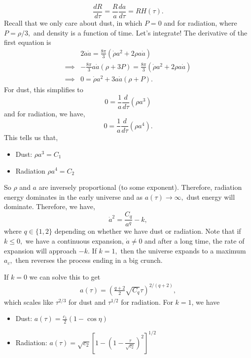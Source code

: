 \documentclass{article}
\numberwithin{equation}{section}
\begin{document}
\begin{equation}
    \frac{dR}{d\tau} = \frac{R}{a} \frac{da}{d\tau} = RH(\tau).
\end{equation}
Recall that we only care about dust, in which $P=0$ and for radiation, where $P=\rho/3,$ and density is a function of time. Let's integrate! The derivative of the first equation is
\begin{align*}
    & 2\ddot{a}\dot{a} = \frac{8\pi}{3}\left(\dot{\rho}a^2 + 2\rho a \dot{a}\right) \\ 
    \implies & -\frac{8\pi}{3}a\dot{a}\left(\rho+3P\right)= \frac{8\pi}{3}\left(\dot{\rho}a^2 + 2\rho a \dot{a}\right) \\  
    \implies & 0 = \dot{\rho}a^2 + 3a\dot{a}(\rho+P).
\end{align*}
For dust, this simplifies to 
\begin{equation}
    0 = \frac{1}{a}\frac{d}{d\tau}(\rho a^3)
\end{equation}
and for radiation, we have,
\begin{equation}
    0 = \frac{1}{a}\frac{d}{d\tau}(\rho a^4).
\end{equation}
This tells us that,
\begin{itemize}
    \item Dust: $\rho a^3 = C_1$
    \item Radiation $\rho a^4 = C_2$
\end{itemize}
So $\rho$ and $a$ are inversely proportional (to some exponent). Therefore, radiation energy dominates in the early universe and as $a(\tau) \to \infty,$ dust energy will dominate. Therefore, we have,
\begin{equation}
    \dot{a}^2 = \frac{C_q}{a^q} - k,
\end{equation}
where $q\in \{1,2\}$ depending on whether we have dust or radiation. Note that if $k \le 0,$ we have a continuous expansion, $\dot{a} \neq 0$ and after a long time, the rate of expansion will approach $-k.$ If $k = 1,$ then the universe expands to a maximum $a_c,$ then reverses the process ending in a big crunch.

If $k=0$ we can solve this to get 
\begin{align*}
    a(\tau) = \left(\frac{q+2}{2}\sqrt{C_q}\tau\right)^{2/(q+2)},
\end{align*}
which scales like $\tau^{2/3}$ for dust and $\tau^{1/2}$ for radiation. For $k=1$, we have 
\begin{itemize}
    \item Dust: $a(\tau) = \frac{c_1}{2}(1-\cos \eta)$
    \item Radiation: $a(\tau) = \sqrt{c_2}\left[1 - \left(1 - \frac{\tau}{\sqrt{c_2}}\right)^2\right]^{1/2}$
\end{itemize}
\end{document}
